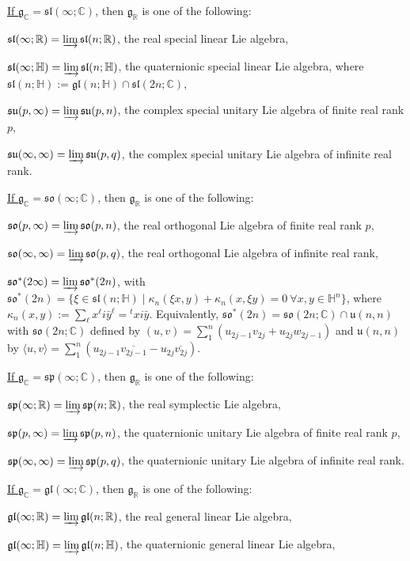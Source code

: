 \documentclass[oneside,leqno,11pt]{article}
\def\gg{\mathfrak{g}}
\def\ggl{\mathfrak{gl}}
\def\gs{\mathfrak{s}}
\def\gsl{\mathfrak{sl}}
\def\gso{\mathfrak{so}}
\def\gsp{\mathfrak{sp}}
\def\gu{\mathfrak{u}}
\def\C{\mathbb{C}}
\def\H{\mathbb{H}}
\def\R{\mathbb{R}}
\begin{document}
\noindent
\underline{If  $\gg_\C = \gsl(\infty;\C)$},  then $\gg_\R$ is one of the 
following:

$\gsl(\infty;\R) = \varinjlim \gsl(n;\R)$, the real 
special linear Lie algebra, 

$\gsl(\infty;\H) = \varinjlim \gsl(n;\H)$, the quaternionic 
special linear Lie algebra, where
$\gsl(n;\H) := \ggl(n;\H) \cap \gsl(2n;\C)$,  

$\gs\gu(p,\infty) = \varinjlim \gs\gu(p,n)$, the complex special 
unitary Lie algebra of finite real rank $p$,

$\gs\gu(\infty,\infty) = \varinjlim \gs\gu(p,q)$, the complex
special unitary Lie algebra of infinite real rank.
\medskip

\noindent
\underline{If  $\gg_\C = \gso(\infty;\C)$},  then $\gg_\R$ is one of the following:

$\gso(p,\infty) = \varinjlim \gso(p,n)$, the real orthogonal
Lie algebra of finite real rank $p$,

$\gso(\infty,\infty) = \varinjlim \gso(p,q)$, the real
orthogonal Lie algebra of infinite real rank,

$\gso^*(2\infty) = \varinjlim \gso^*(2n)$, 
with
$\gso^*(2n) = \{\xi \in \gsl(n;\H) \mid \kappa_n(\xi x,y) +\kappa_n(x, \xi y)=0 \  \forall x,y \in \H^n \}$, where $ \kappa_n(x,y) := \sum_\ell x^\ell i \bar y^\ell = {}^tx i \bar y$.  Equivalently, $\gso^*(2n) = \gso(2n;\C)\cap 
\gu(n,n)$ with $\gso(2n;\C)$ defined by 
$(u,v) = \sum_1^n (u_{2j-1} v_{2j} + u_{2j}w_{2j-1})$ and $\gu(n,n)$ by
$\langle u,v\rangle = 
\sum_1^n (u_{2j-1} \overline{v_{2j-1}}-u_{2j}\overline{v_{2j}})$. 
\medskip

\noindent
\underline{If  $\gg_\C = \gsp(\infty;\C)$},  then $\gg_\R$ is one of the following:

$\gsp(\infty;\R) = \varinjlim \gsp(n;\R)$, the real
symplectic Lie algebra,

$\gsp(p,\infty) = \varinjlim \gsp(p,n)$, the quaternionic unitary
Lie algebra of finite real rank $p$,

$\gsp(\infty,\infty) = \varinjlim \gsp(p,q)$, the quaternionic
unitary Lie algebra of infinite real rank.
\medskip

\noindent
\underline{If  $\gg_\C = \ggl(\infty;\C)$},  then $\gg_\R$ is one of the following:

$\ggl(\infty;\R) = \varinjlim \ggl(n;\R)$, the real
general linear Lie algebra,

$\ggl(\infty;\H) = \varinjlim \ggl(n;\H)$, the quaternionic
general linear Lie algebra,
\end{document}
